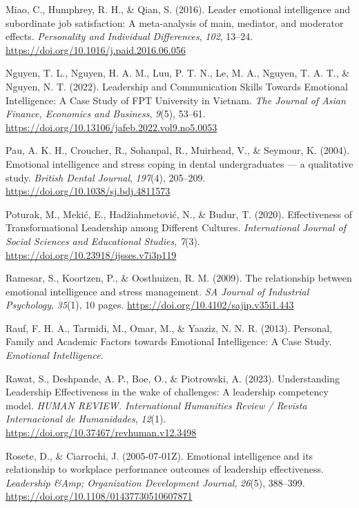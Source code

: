 \documentclass[
  man,
  longtable,
  nolmodern,
  notxfonts,
  notimes,
  colorlinks=true,linkcolor=blue,citecolor=blue,urlcolor=blue]{apa7}
\newlength{\cslhangindent}
\newenvironment{CSLReferences}[2] %
 {\begin{list}{}{%
  \setlength{\itemindent}{0pt}
  \setlength{\leftmargin}{0pt}
  \setlength{\parsep}{0pt}
  \ifodd #1
   \setlength{\leftmargin}{\cslhangindent}
   \setlength{\itemindent}{-1\cslhangindent}
  \fi
  \setlength{\itemsep}{#2\baselineskip}}}
 {\end{list}}
\begin{document}
\begin{CSLReferences}{1}{0}
Miao, C., Humphrey, R. H., \& Qian, S. (2016). Leader emotional
intelligence and subordinate job satisfaction: {A} meta-analysis of
main, mediator, and moderator effects. \emph{Personality and Individual
Differences}, \emph{102}, 13--24.
\url{https://doi.org/10.1016/j.paid.2016.06.056}

Nguyen, T. L., Nguyen, H. A. M., Luu, P. T. N., Le, M. A., Nguyen, T. A.
T., \& Nguyen, N. T. (2022). Leadership and {Communication Skills
Towards Emotional Intelligence}: {A Case Study} of {FPT University} in
{Vietnam}. \emph{The Journal of Asian Finance, Economics and Business},
\emph{9}(5), 53--61.
\url{https://doi.org/10.13106/jafeb.2022.vol9.no5.0053}

Pau, A. K. H., Croucher, R., Sohanpal, R., Muirhead, V., \& Seymour, K.
(2004). Emotional intelligence and stress coping in dental
undergraduates --- a qualitative study. \emph{British Dental Journal},
\emph{197}(4), 205--209. \url{https://doi.org/10.1038/sj.bdj.4811573}

Poturak, M., Mekić, E., Hadžiahmetović, N., \& Budur, T. (2020).
Effectiveness of {Transformational Leadership} among {Different
Cultures}. \emph{International Journal of Social Sciences and
Educational Studies}, \emph{7}(3).
\url{https://doi.org/10.23918/ijsses.v7i3p119}

Ramesar, S., Koortzen, P., \& Oosthuizen, R. M. (2009). The relationship
between emotional intelligence and stress management. \emph{SA Journal
of Industrial Psychology}, \emph{35}(1), 10 pages.
\url{https://doi.org/10.4102/sajip.v35i1.443}

Rauf, F. H. A., Tarmidi, M., Omar, M., \& Yaaziz, N. N. R. (2013).
Personal, {Family} and {Academic Factors} towards {Emotional
Intelligence}: {A Case Study}. \emph{Emotional Intelligence}.

Rawat, S., Deshpande, A. P., Boe, O., \& Piotrowski, A. (2023).
Understanding {Leadership Effectiveness} in the wake of challenges: A
leadership competency model. \emph{HUMAN REVIEW. International
Humanities Review / Revista Internacional de Humanidades}, \emph{12}(1).
\url{https://doi.org/10.37467/revhuman.v12.3498}

Rosete, D., \& Ciarrochi, J. (2005-07-01Z). Emotional intelligence and
its relationship to workplace performance outcomes of leadership
effectiveness. \emph{Leadership \&Amp; Organization Development
Journal}, \emph{26}(5), 388--399.
\url{https://doi.org/10.1108/01437730510607871}


\end{CSLReferences}
\end{document}
